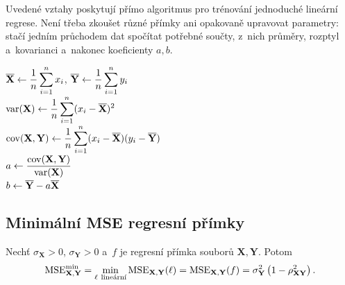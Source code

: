 Uvedené vztahy poskytují přímo algoritmus pro trénování jednoduché lineární regrese. Není třeba zkoušet různé přímky ani opakovaně upravovat parametry: stačí jedním průchodem dat spočítat potřebné součty, z~nich průměry, rozptyl a~kovarianci a~nakonec koeficienty \(a,b\).

\begin{algorithm}
    \caption{\textsc{linear-regression}}
    \label{alg:ai-linear-regression}
    \(\displaystyle\overline{\mathbf{X}}\gets\frac1n\sum_{i=1}^{n}x_i\), \(\displaystyle\overline{\mathbf{Y}}\gets\frac1n\sum_{i=1}^{n}y_i\)\\
    \(\displaystyle\operatorname{var}(\mathbf{X})\gets\frac1n\sum_{i=1}^{n}(x_i-\overline{\mathbf{X}})^2\)\\
    \(\displaystyle\operatorname{cov}(\mathbf{X},\mathbf{Y})\gets\frac1n\sum_{i=1}^{n}(x_i-\overline{\mathbf{X}})(y_i-\overline{\mathbf{Y}})\)\\
    \(\displaystyle a\gets\frac{\operatorname{cov}(\mathbf{X},\mathbf{Y})}{\operatorname{var}(\mathbf{X})}\)\\
    \(b\gets\overline{\mathbf{Y}}-a\overline{\mathbf{X}}\)\\
\end{algorithm}

\subsection{Minimální MSE regresní přímky}

\begin{proposition}\label{prop:ai-regrese-min-mse}
    Nechť \(\sigma_{\mathbf{X}}>0\), \(\sigma_{\mathbf{Y}}>0\) a~\(f\) je regresní přímka souborů \(\mathbf{X},\mathbf{Y}\). Potom
    \[
        \operatorname{MSE}_{\mathbf{X},\mathbf{Y}}^{\min}
        =
        \min_{\ell\ \text{lineární}}
        \operatorname{MSE}_{\mathbf{X},\mathbf{Y}}(\ell)
        =
        \operatorname{MSE}_{\mathbf{X},\mathbf{Y}}(f)
        =
        \sigma_{\mathbf{Y}}^2
        \left(1-\rho_{\mathbf{X}\mathbf{Y}}^2\right).
    \]
\end{proposition}

